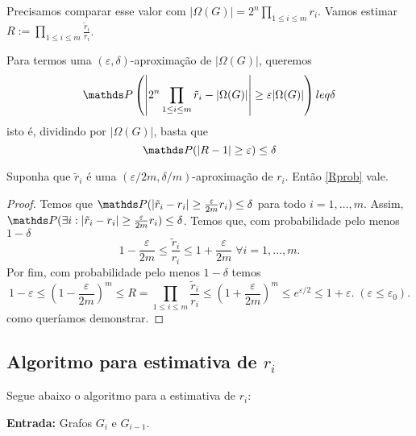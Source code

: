 Precisamos comparar esse valor com $|\Omega(G)| = 2^n\prod_{1 \leq i \leq m}r_i$. 
Vamos estimar $R:= \prod_{1 \leq i \leq m} \frac{\tilde{r}_i}{r_i}$.

Para termos uma $(\varepsilon, \delta)$-aproximação de $|\Omega(G)|$,
queremos
\begin{equation*}\label{key}
	\PP\left(\left|2^n\prod_{1 \leq i \leq m}\tilde{r}_i - |\Omega(G)| \right| \geq \varepsilon|\Omega(G)|\right) leq \delta
\end{equation*}
isto é, dividindo por $|\Omega(G)|$, basta que
\begin{equation}\label{Rprob}
	\PP(|R-1| \geq \varepsilon) \leq \delta
\end{equation}
\begin{lema}
	Suponha que $\tilde{r}_i$ é uma $(\varepsilon/2m, \delta/m)$-aproximação de $r_i$.
	Então \ref{Rprob} vale.
\end{lema}
\begin{proof}
	Temos que $\PP(|\tilde{r}_i - r_i|\geq \frac{\varepsilon}{2m}r_i)\leq \delta$
	para todo $i = 1, \dots, m$. Assim, 
	${\PP(\exists i : |\tilde{r}_i - r_i|\geq \frac{\varepsilon}{2m}r_i) \leq \delta}$.	 
	Temos que, com probabilidade pelo menos $1-\delta$
	$$ 1 - \frac{\varepsilon}{2m} \leq \frac{\tilde{r}_i}{r_i} \leq 1 + \frac{\varepsilon}{2m} \; \forall i = 1, \dots, m.$$
	Por fim, com probabilidade pelo menos $1 - \delta$ temos
	$$1-\varepsilon \leq \left(1 - \frac{\varepsilon}{2m}\right)^m \leq R = \prod_{1 \leq i \leq m}\frac{\tilde{r}_i}{r_i} \leq \left(1 + \frac{\varepsilon}{2m}\right)^m\leq e^{\varepsilon/2} \leq 1 + \varepsilon. \;(\varepsilon \leq \varepsilon_0).$$
	como queríamos demonstrar.
\end{proof}
\subsection{Algoritmo para estimativa de $r_i$}

Segue abaixo o algoritmo para a estimativa de $r_i$:

\textbf{Entrada:} Grafos $G_i$ e $G_{i-1}$.

